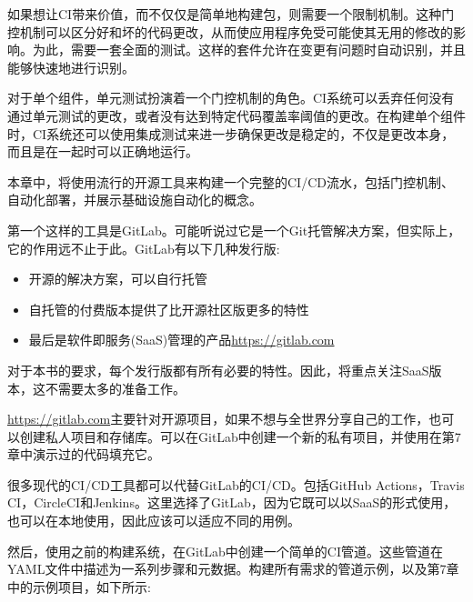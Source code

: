 
如果想让CI带来价值，而不仅仅是简单地构建包，则需要一个限制机制。这种门控机制可以区分好和坏的代码更改，从而使应用程序免受可能使其无用的修改的影响。为此，需要一套全面的测试。这样的套件允许在变更有问题时自动识别，并且能够快速地进行识别。

对于单个组件，单元测试扮演着一个门控机制的角色。CI系统可以丢弃任何没有通过单元测试的更改，或者没有达到特定代码覆盖率阈值的更改。在构建单个组件时，CI系统还可以使用集成测试来进一步确保更改是稳定的，不仅是更改本身，而且是在一起时可以正确地运行。


本章中，将使用流行的开源工具来构建一个完整的CI/CD流水，包括门控机制、自动化部署，并展示基础设施自动化的概念。

第一个这样的工具是GitLab。可能听说过它是一个Git托管解决方案，但实际上，它的作用远不止于此。GitLab有以下几种发行版:

\begin{itemize}
\item 
开源的解决方案，可以自行托管

\item 
自托管的付费版本提供了比开源社区版更多的特性

\item 
最后是软件即服务(SaaS)管理的产品\url{https://gitlab.com}
\end{itemize}

对于本书的要求，每个发行版都有所有必要的特性。因此，将重点关注SaaS版本，这不需要太多的准备工作。

\url{https://gitlab.com}主要针对开源项目，如果不想与全世界分享自己的工作，也可以创建私人项目和存储库。可以在GitLab中创建一个新的私有项目，并使用在第7章中演示过的代码填充它。

很多现代的CI/CD工具都可以代替GitLab的CI/CD。包括GitHub Actions，Travis CI，CircleCI和Jenkins。这里选择了GitLab，因为它既可以以SaaS的形式使用，也可以在本地使用，因此应该可以适应不同的用例。

然后，使用之前的构建系统，在GitLab中创建一个简单的CI管道。这些管道在YAML文件中描述为一系列步骤和元数据。构建所有需求的管道示例，以及第7章中的示例项目，如下所示:


